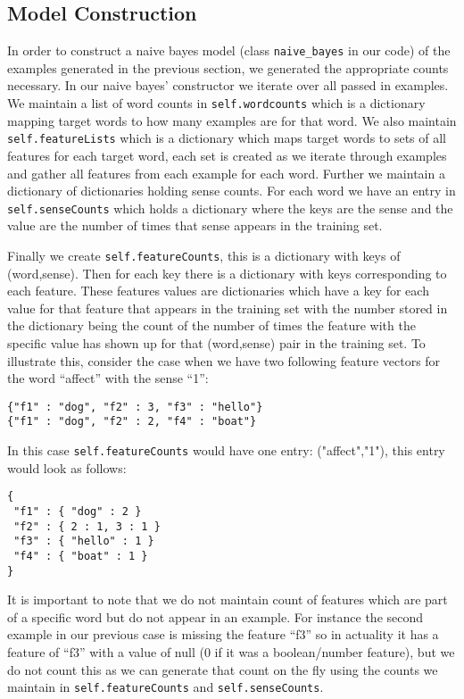 \documentclass{article}
\begin{document}
\subsection{Model Construction}

In order to construct a naive bayes model (class \texttt{naive\_bayes} in our code) of the examples generated in the previous section, we generated the appropriate counts necessary. In our naive bayes' constructor we iterate over all passed in examples. We maintain a list of word counts in \texttt{self.wordcounts} which is a dictionary mapping target words to how many examples are for that word. We also maintain \texttt{self.featureLists} which is a dictionary which maps target words to sets of all features for each target word, each set is created as we iterate through examples and gather all features from each example for each word. Further we maintain a dictionary of dictionaries holding sense counts. For each word we have an entry in \texttt{self.senseCounts} which holds a dictionary where the keys are the sense and the value are the number of times that sense appears in the training set. 

Finally we create \texttt{self.featureCounts}, this is a dictionary with keys of (word,sense). Then for each key there is a dictionary with keys corresponding to each feature. These features values are dictionaries which have a key for each value for that feature that appears in the training set with the number stored in the dictionary being the count of the number of times the feature with the specific value has shown up for that (word,sense) pair in the training set. To illustrate this, consider the case when we have two following feature vectors for the word ``affect'' with the sense ``1'':
{\small
\begin{verbatim}
{"f1" : "dog", "f2" : 3, "f3" : "hello"}
{"f1" : "dog", "f2" : 2, "f4" : "boat"}
\end{verbatim}
}
In this case \texttt{self.featureCounts} would have one entry: ("affect","1"), this entry would look as follows:
{\small
\begin{verbatim}
{
 "f1" : { "dog" : 2 }
 "f2" : { 2 : 1, 3 : 1 }
 "f3" : { "hello" : 1 }
 "f4" : { "boat" : 1 }
}
\end{verbatim}
}

It is important to note that we do not maintain count of features which are part of a specific word but do not appear in an example. For instance the second example in our previous case is missing the feature ``f3'' so in actuality it has a feature of ``f3'' with a value of null (0 if it was a boolean/number feature), but we do not count this as we can generate that count on the fly using the counts we maintain in \texttt{self.featureCounts} and \texttt{self.senseCounts}.
\end{document}
